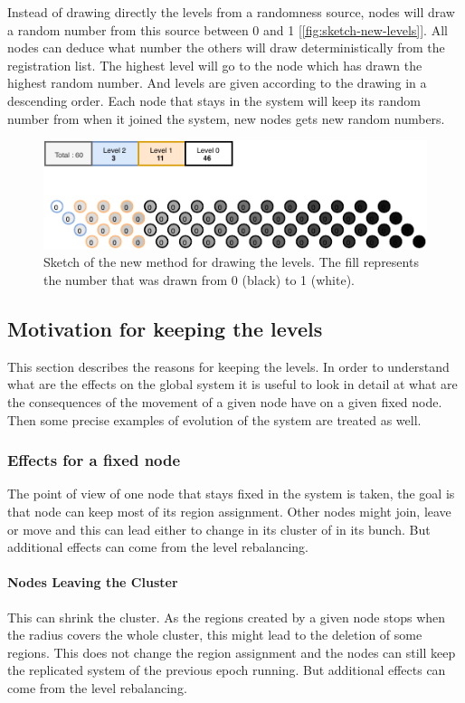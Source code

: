 \documentclass[a4paper,11pt,oneside]{report}
\begin{document}
Instead of drawing directly the levels from a randomness source, nodes will
draw a random number from this source between 0 and 1
[\autoref{fig:sketch-new-levels}].  All nodes can deduce what number the others
will draw deterministically from the registration list.  The highest level will
go to the node which has drawn the highest random number.  And levels are given
according to the drawing in a descending order.  Each node that stays in the
system will keep its random number from when it joined the system, new nodes
gets new random numbers. 

\begin{figure}[!h] 
\centering
\includegraphics[width=400pt]{figures/Lottery-Locarno}
\caption{Sketch of the new method for drawing the levels. The fill represents the number that was drawn from 0 (black) to 1 (white).}
\label{fig:sketch-new-levels}
\end{figure}


\subsection{Motivation for keeping the levels}
This section describes the reasons for keeping the levels. In order to
understand what are the effects on the global system it is useful to look in
detail at what are the consequences of the movement of a given node have on a
given fixed node. Then some precise examples of evolution of the system are
treated as well. 

\subsubsection{Effects for a fixed node} 
The point of view of one node that stays fixed in the system is taken, the goal
is that node can keep most of its region assignment.  Other nodes might
join, leave or move and this can lead either to change in its cluster of in its
bunch. But additional effects can come from the level rebalancing. 

\paragraph{Nodes Leaving the Cluster} 
This can shrink the cluster. As the regions created by a given node stops when
the radius covers the whole cluster, this might lead to the deletion of some
regions. This does not change the
region assignment and the nodes can still keep the replicated system of the
previous epoch running. But additional effects can come from the level rebalancing. 
\end{document}
